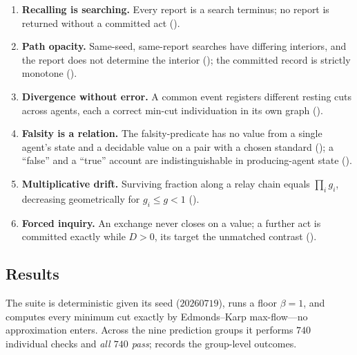 \documentclass[11pt,twocolumn,a4paper]{article}
\newcommand{\flo}{\beta}
\newcommand{\dem}{D}
\begin{document}
\begin{enumerate}[label=\textbf{(V\arabic*)},leftmargin=*]
\item \textbf{Recalling is searching.} Every report is a search terminus;
no report is returned without a committed act ().
\item \textbf{Path opacity.} Same-seed, same-report searches have differing
interiors, and the report does not determine the interior
(); the committed record is strictly monotone
().
\item \textbf{Divergence without error.} A common event registers different
resting cuts across agents, each a correct min-cut individuation in its own
graph ().
\item \textbf{Falsity is a relation.} The falsity-predicate has no value from
a single agent's state and a decidable value on a pair with a chosen standard
(); a ``false'' and a ``true''
account are indistinguishable in producing-agent state
().
\item \textbf{Multiplicative drift.} Surviving fraction along a relay chain
equals $\prod_i g_i$, decreasing geometrically for $g_i\le g<1$
().
\item \textbf{Forced inquiry.} An exchange never closes on a value; a further
act is committed exactly while $\dem>0$, its target the unmatched contrast
().
\end{enumerate}

\subsection{Results}

The suite is deterministic given its seed ($20260719$), runs a floor
$\flo=1$, and computes every minimum cut exactly by Edmonds--Karp
max-flow---no approximation enters. Across the nine prediction groups it
performs $740$ individual checks and \emph{all $740$ pass};
 records the group-level outcomes.
\end{document}
